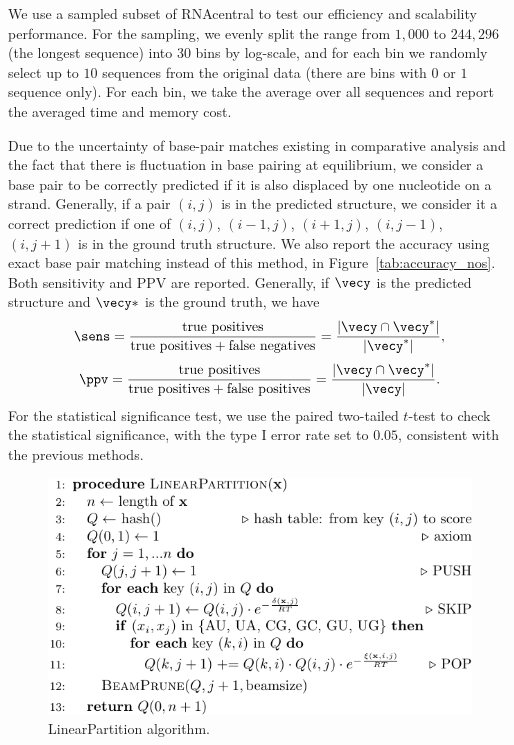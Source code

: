 We use a sampled subset of RNAcentral to test our efficiency and scalability
performance. For the sampling, we evenly split the range from $1,000$ to
$244,296~$(the longest sequence) into 30 bins by log-scale, and for each bin we
randomly select up to $10$ sequences from the original data (there are bins with
$0$ or $1$ sequence only).
For each bin, we take the average over all sequences
and report the averaged time and memory cost. 


Due to the uncertainty of base-pair matches existing in comparative analysis
and the fact that there is fluctuation in base pairing at equilibrium,
we
consider a base pair to be correctly predicted if it is also displaced by one
nucleotide on a strand.\cite{sloma+mathews:2016}
Generally, if a pair $(i,j)$ is in the predicted structure, we consider it a
correct prediction if one of $(i,j)$, $(i-1,j)$, $(i+1,j)$, $(i,j-1)$, $(i,j+1)$ is in the
ground truth structure.
We also report the accuracy using exact base pair matching instead of this
method, in Figure~\ref{tab:accuracy_nos}. 
Both sensitivity and PPV are reported.
Generally, if $\vecy$ is the predicted structure and $\vecy*$ is the ground
truth, we have
$$ \sens = \frac{\text{true positives}}{\text{true positives} +
  \text{false negatives}} =
\frac{|\vecy \cap \vecy^*|}{|\vecy^*|},$$
$$\ppv = \frac{\text{true positives}}{\text{true positives} +
  \text{false positives}} = \frac{|\vecy \cap \vecy^*|}{|\vecy|}. $$
For the statistical significance test, 
we use the paired two-tailed $t$-test to check the statistical significance,
with the type I error rate set to $0.05$,
consistent with the previous methods. \cite{xu+:2011}



\begin{figure}[b]
\center
\includegraphics[scale=1]{figs/algorithm}
\caption{
LinearPartition algorithm.
\label{algorithm}}
\vspace{-0.3cm}
\end{figure}